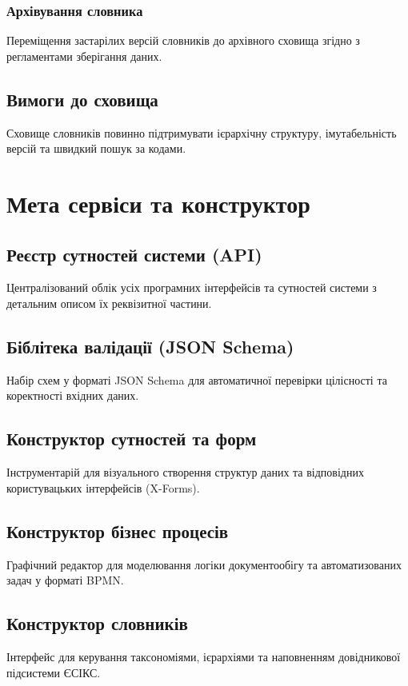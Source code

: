 \documentclass{article}
\begin{document}
\subsubsection{Архівування словника}
Переміщення застарілих версій словників до архівного сховища згідно з регламентами зберігання даних.

\subsection{Вимоги до сховища}
Сховище словників повинно підтримувати ієрархічну структуру, імутабельність версій та швидкий пошук за кодами.

\newpage
\section{Мета сервіси та конструктор}
\subsection{Реєстр сутностей системи (API)}
Централізований облік усіх програмних інтерфейсів та сутностей системи з детальним описом їх реквізитної частини.

\subsection{Біблітека валідації (JSON Schema)}
Набір схем у форматі JSON Schema для автоматичної перевірки цілісності та коректності вхідних даних.

\subsection{Конструктор сутностей та форм}
Інструментарій для візуального створення структур даних та відповідних користувацьких інтерфейсів (X-Forms).

\subsection{Конструктор бізнес процесів}
Графічний редактор для моделювання логіки документообігу та автоматизованих задач у форматі BPMN.

\subsection{Конструктор словників}
Інтерфейс для керування таксономіями, ієрархіями та наповненням довідникової підсистеми ЄСІКС.
\end{document}
